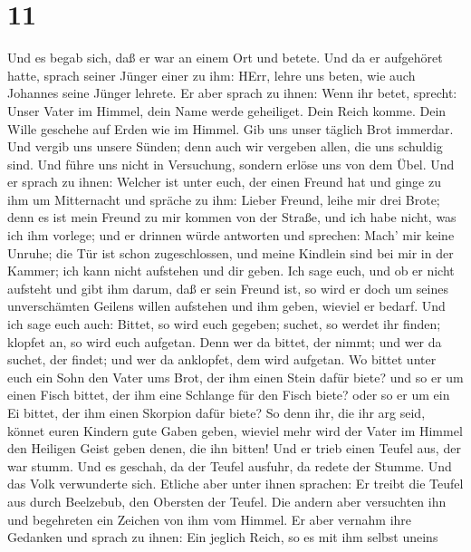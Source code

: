 \hypertarget{section-10}{%
\section{11}\label{section-10}}

 Und es begab sich, daß er war an einem Ort und betete. Und
da er aufgehöret hatte, sprach seiner Jünger einer zu ihm: HErr, lehre
uns beten, wie auch Johannes seine Jünger lehrete.  Er aber
sprach zu ihnen: Wenn ihr betet, sprecht: Unser Vater im Himmel, dein
Name werde geheiliget. Dein Reich komme. Dein Wille geschehe auf Erden
wie im Himmel.  Gib uns unser täglich Brot immerdar.
 Und vergib uns unsere Sünden; denn auch wir vergeben allen,
die uns schuldig sind. Und führe uns nicht in Versuchung, sondern erlöse
uns von dem Übel.  Und er sprach zu ihnen: Welcher ist unter
euch, der einen Freund hat und ginge zu ihm um Mitternacht und spräche
zu ihm: Lieber Freund, leihe mir drei Brote;  denn es ist
mein Freund zu mir kommen von der Straße, und ich habe nicht, was ich
ihm vorlege;  und er drinnen würde antworten und sprechen:
Mach' mir keine Unruhe; die Tür ist schon zugeschlossen, und meine
Kindlein sind bei mir in der Kammer; ich kann nicht aufstehen und dir
geben.  Ich sage euch, und ob er nicht aufsteht und gibt ihm
darum, daß er sein Freund ist, so wird er doch um seines unverschämten
Geilens willen aufstehen und ihm geben, wieviel er bedarf. 
Und ich sage euch auch: Bittet, so wird euch gegeben; suchet, so werdet
ihr finden; klopfet an, so wird euch aufgetan.  Denn wer da
bittet, der nimmt; und wer da suchet, der findet; und wer da anklopfet,
dem wird aufgetan.  Wo bittet unter euch ein Sohn den Vater
ums Brot, der ihm einen Stein dafür biete? und so er um einen Fisch
bittet, der ihm eine Schlange für den Fisch biete?  oder so
er um ein Ei bittet, der ihm einen Skorpion dafür biete? 
So denn ihr, die ihr arg seid, könnet euren Kindern gute Gaben geben,
wieviel mehr wird der Vater im Himmel den Heiligen Geist geben denen,
die ihn bitten!  Und er trieb einen Teufel aus, der war
stumm. Und es geschah, da der Teufel ausfuhr, da redete der Stumme. Und
das Volk verwunderte sich.  Etliche aber unter ihnen
sprachen: Er treibt die Teufel aus durch Beelzebub, den Obersten der
Teufel.  Die andern aber versuchten ihn und begehreten ein
Zeichen von ihm vom Himmel.  Er aber vernahm ihre Gedanken
und sprach zu ihnen: Ein jeglich Reich, so es mit ihm selbst uneins
